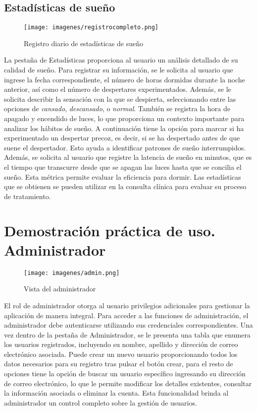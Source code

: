 \documentclass[a4paper,12pt,twoside]{memoir}
\begin{document}
 \subsection{Estadísticas de sueño}
  \begin{figure}
        \centering
        \texttt{[image: imagenes/registrocompleto.png]} 
        \caption{Registro diario de estadísticas de sueño}
        \label{fig:ejemplo}
    \end{figure}
    La pestaña de Estadísticas proporciona al usuario un análisis detallado de su calidad de sueño. Para registrar su información, se le solicita al usuario que ingrese la fecha correspondiente, el número de horas dormidas durante la noche anterior, así como el número de despertares experimentados. Además, se le solicita describir la sensación con la que se despierta, seleccionando entre las opciones de \textit{cansado}, \textit{descansado}, o \textit{normal}. También se registra la hora de apagado y encendido de luces, lo que proporciona un contexto importante para analizar los hábitos de sueño. A continuación tiene la opción para marcar si ha experimentado un despertar precoz, es decir, si se ha despertado antes de que suene el despertador. Esto ayuda a identificar patrones de sueño interrumpidos. Además, se solicita al usuario que registre la latencia de sueño en minutos, que es el tiempo que transcurre desde que se apagan las luces hasta que se concilia el sueño. Esta métrica permite evaluar la eficiencia para dormir. Las estadísticas que se obtienen se pueden utilizar en la consulta clínica para evaluar su proceso de tratamiento.
 \section{Demostración práctica de uso. Administrador}
 \begin{figure}
    \centering
    \texttt{[image: imagenes/admin.png]}
    \caption{Vista del administrador}
    \label{fig:enter-label}
\end{figure}
El rol de administrador otorga al usuario privilegios adicionales para gestionar la aplicación de manera integral. Para acceder a las funciones de administración, el administrador debe autenticarse utilizando sus credenciales correspondientes. Una vez dentro de la pestaña de Administrador, se le presenta una tabla que enumera los usuarios registrados, incluyendo su nombre, apellido y dirección de correo electrónico asociada. Puede crear un nuevo usuario proporcionando todos los datos necesarios para su registro tras pulsar el botón crear, para el resto de opciones tiene la opción de buscar un usuario específico ingresando su dirección de correo electrónico, lo que le permite modificar los detalles existentes, consultar la información asociada o eliminar la cuenta. Esta funcionalidad brinda al administrador un control completo sobre la gestión de usuarios.
\end{document}
